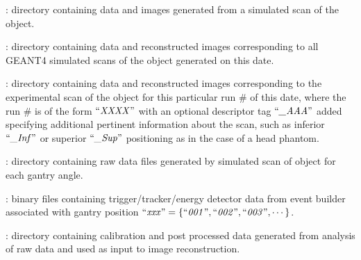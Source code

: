 \documentclass[landscape,12pt]{article}
\begin{document}
\begin{myEnumerate}[labelindent=1pt, leftmargin=*]
\begin{myEnumerate}[labelindent=1pt, leftmargin=*]
\begin{myEnumerate}[labelindent=1pt, leftmargin=*]
\begin{myEnumerate}[labelindent=1pt, leftmargin=*]
\begin{myEnumerate}[labelindent=1pt, leftmargin=*]
                    \end{myEnumerate}
                \end{myEnumerate}
            \end{myEnumerate}
            \item {} \color{Black}: directory containing data and images generated from a simulated scan of the object.
            \begin{myEnumerate}[labelindent=1pt, leftmargin=*]
                \item {} \color{Black}: directory containing data and reconstructed images corresponding to all GEANT4 simulated scans of the object generated on this date.
                \begin{myEnumerate}[labelindent=1pt, leftmargin=*]
                    \item {} \color{Black}: directory containing data and reconstructed images corresponding to the experimental scan of the object for this particular run \# of this date, where the run \# is of the form $\textrm{``\textit{XXXX}''}$ with an optional descriptor tag $\textrm{``\textit{\_AAA}''}$ added specifying additional pertinent information about the scan, such as inferior $\textrm{``\textit{\_Inf}''}$ or superior $\textrm{``\textit{\_Sup}''}$ positioning as in the case of a head phantom.
                    \begin{myEnumerate}[labelindent=1pt, leftmargin=*]
                        \item {} \color{Black}: directory containing raw data files generated by simulated scan of object for each gantry angle.
                        \begin{myEnumerate}[labelindent=1pt, leftmargin=*]
                            \item {} \color{Black}: binary files containing trigger/tracker/energy detector data from event builder associated with gantry position $\textrm{``\textit{xxx}''} =\{\textrm{``\textit{001}''}, \textrm{``\textit{002}''}, \textrm{``\textit{003}''}, \cdots\}$.
                        \end{myEnumerate}
                        \item {} \color{Black}: directory containing calibration and post processed data generated from analysis of raw data and used as input to image reconstruction.

\end{myEnumerate}
\end{myEnumerate}
\end{myEnumerate}
\end{myEnumerate}
\end{myEnumerate}
\end{document}
